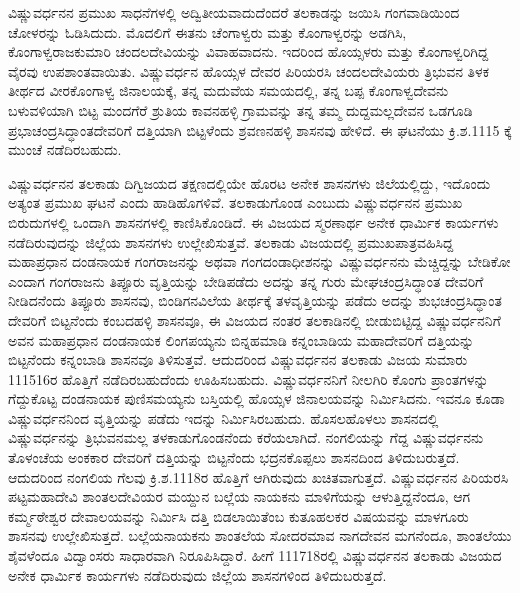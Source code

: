 ವಿಷ್ಣುವರ್ಧನನ ಪ್ರಮುಖ ಸಾಧನೆಗಳಲ್ಲಿ ಅದ್ವಿತೀಯವಾದುದೆಂದರೆ ತಲಕಾಡನ್ನು ಜಯಿಸಿ ಗಂಗವಾಡಿಯಿಂದ ಚೋಳರನ್ನು ಓಡಿಸಿದುದು. ಮೊದಲಿಗೆ ಈತನು ಚೆಂಗಾಳ್ವರು ಮತ್ತು ಕೊಂಗಾಳ್ವರನ್ನು ಅಡಗಿಸಿ, ಕೊಂಗಾಳ್ವರಾಜಕುಮಾರಿ ಚಂದಲದೇವಿಯನ್ನು ವಿವಾಹವಾದನು. ಇದರಿಂದ ಹೊಯ್ಸಳರು ಮತ್ತು ಕೊಂಗಾಳ್ವರಿಗಿದ್ದ ವೈರವು ಉಪಶಾಂತವಾಯಿತು. ವಿಷ್ಣುವರ್ಧನ ಹೊಯ್ಸಳ ದೇವರ ಪಿರಿಯರಸಿ ಚಂದಲದೇವಿಯರು ತ್ರಿಭುವನ ತಿಳಕ ತೀರ್ಥದ ವೀರಕೊಂಗಾಳ್ವ ಜಿನಾಲಯಕ್ಕೆ, ತನ್ನ ಮದುವೆಯ ಸಮಯದಲ್ಲಿ, ತನ್ನ ಬಪ್ಪ ಕೊಂಗಾಳ್ವದೇವನು ಬಳುವಳಿಯಾಗಿ ಬಿಟ್ಟ ಮಂದಗೆರೆ ಶ್ರುತಿಯ ಕಾವನಹಳ್ಳಿ ಗ್ರಾಮವನ್ನು ತನ್ನ ತಮ್ಮ ದುದ್ದಮಲ್ಲದೇವನ ಒಡಗೂಡಿ ಪ್ರಭಾಚಂದ್ರಸಿದ್ಧಾಂತದೇವರಿಗೆ ದತ್ತಿಯಾಗಿ ಬಿಟ್ಟಳೆಂದು ಶ್ರವಣನಹಳ್ಳಿ ಶಾಸನವು ಹೇಳಿದೆ. ಈ ಘಟನೆಯು ಕ್ರಿ.ಶ.1115 ಕ್ಕೆ ಮುಂಚೆ ನಡೆದಿರಬಹುದು. 

ವಿಷ್ಣುವರ್ಧನನ ತಲಕಾಡು ದಿಗ್ವಿಜಯದ ತಕ್ಷಣದಲ್ಲಿಯೇ ಹೊರಟ ಅನೇಕ ಶಾಸನಗಳು ಜಿಲೆಯಲ್ಲಿದ್ದು, ಇದೊಂದು ಅತ್ಯಂತ ಪ್ರಮುಖ ಘಟನೆ ಎಂದು ಹಾಡಿಹೊಗಳಿವೆ. ತಲಕಾಡುಗೊಂಡ ಎಂಬುದು ವಿಷ್ಣುವರ್ಧನನ ಪ್ರಮುಖ ಬಿರುದುಗಳಲ್ಲಿ ಒಂದಾಗಿ ಶಾಸನಗಳಲ್ಲಿ ಕಾಣಿಸಿಕೊಂಡಿದೆ. ಈ ವಿಜಯದ ಸ್ಮರಣಾರ್ಥ ಅನೇಕ ಧಾರ್ಮಿಕ ಕಾರ್ಯಗಳು ನಡೆದಿರುವುದನ್ನು ಜಿಲ್ಲೆಯ ಶಾಸನಗಳು ಉಲ್ಲೇಖಿಸುತ್ತವೆ. ತಲಕಾಡು ವಿಜಯದಲ್ಲಿ ಪ್ರಮುಖಪಾತ್ರವಹಿಸಿದ್ದ ಮಹಾಪ್ರಧಾನ ದಂಡನಾಯಕ ಗಂಗರಾಜನನ್ನು ಅಥವಾ ಗಂಗದಂಡಾಧೀಶನನ್ನು ವಿಷ್ಣುವರ್ಧನನು ಮೆಚ್ಚಿದ್ದನ್ನು ಬೇಡಿಕೋ ಎಂದಾಗ ಗಂಗರಾಜನು ತಿಪ್ಪೂರು ವೃತ್ತಿಯನ್ನು ಬೇಡಿಪಡೆದು ಅದನ್ನು ತನ್ನ ಗುರು ಮೇಘಚಂದ್ರಸಿದ್ಧಾಂತ ದೇವರಿಗೆ ನೀಡಿದನೆಂದು ತಿಪ್ಪೂರು ಶಾಸನವು, ಬಿಂಡಿಗನವಿಲೆಯ ತೀರ್ಥಕ್ಕೆ ತಳವೃತ್ತಿಯನ್ನು ಪಡೆದು ಅದನ್ನು ಶುಭಚಂದ್ರಸಿದ್ಧಾಂತ ದೇವರಿಗೆ ಬಿಟ್ಟನೆಂದು ಕಂಬದಹಳ್ಳಿ ಶಾಸನವೂ, ಈ ವಿಜಯದ ನಂತರ ತಲಕಾಡಿನಲ್ಲಿ ಬೀಡುಬಿಟ್ಟಿದ್ದ ವಿಷ್ಣುವರ್ಧನನಿಗೆ ಅವನ ಮಹಾಪ್ರಧಾನ ದಂಡನಾಯಕ ಲಿಂಗಪಯ್ಯನು ಬಿನ್ನಹಮಾಡಿ ಕನ್ನಂಬಾಡಿಯ ಮಹಾದೇವರಿಗೆ ದತ್ತಿಯನ್ನು ಬಿಟ್ಟನೆಂದು ಕನ್ನಂಬಾಡಿ ಶಾಸನವೂ ತಿಳಿಸುತ್ತವೆ. ಆದುದರಿಂದ ವಿಷ್ಣುವರ್ಧನನ ತಲಕಾಡು ವಿಜಯ ಸುಮಾರು 111516ರ ಹೊತ್ತಿಗೆ ನಡೆದಿರಬಹುದೆಂದು ಊಹಿಸಬಹುದು. ವಿಷ್ಣುವರ್ಧನನಿಗೆ ನೀಲಗಿರಿ ಕೊಂಗು ಪ್ರಾಂತಗಳನ್ನು ಗೆದ್ದುಕೊಟ್ಟ ದಂಡನಾಯಕ ಪುಣಿಸಮಯ್ಯನು ಬಸ್ತಿಯಲ್ಲಿ ಹೊಯ್ಸಳ ಜಿನಾಲಯವನ್ನು ನಿರ್ಮಿಸಿದನು. ಇವನೂ ಕೂಡಾ ವಿಷ್ಣುವರ್ಧನನಿಂದ ವೃತ್ತಿಯನ್ನು ಪಡೆದು ಇದನ್ನು ನಿರ್ಮಿಸಿರಬಹುದು. ಹೊಸಲಹೊಳಲು ಶಾಸನದಲ್ಲಿ ವಿಷ್ಣುವರ್ಧನನ್ನು ತ್ರಿಭುವನಮಲ್ಲ ತಳಕಾಡುಗೊಂಡನೆಂದು ಕರೆಯಲಾಗಿದೆ. ನಂಗಲಿಯನ್ನು ಗೆದ್ದ ವಿಷ್ಣುವರ್ಧನನು ತೊಳಂಚೆಯ ಅಂಕಕಾರ ದೇವರಿಗೆ ದತ್ತಿಯನ್ನು ಬಿಟ್ಟನೆಂದು ಭದ್ರನಕೊಪ್ಪಲು ಶಾಸನದಿಂದ ತಿಳಿದು\-ಬರುತ್ತದೆ. ಆದುದರಿಂದ ನಂಗಲಿಯ ಗೆಲವು ಕ್ರಿ.ಶ.1118ರ ಹೊತ್ತಿಗೆ ಆಗಿರುವುದು ಖಚಿತವಾಗುತ್ತದೆ. ವಿಷ್ಣುವರ್ಧನನ ಪಿರಿಯರಸಿ ಪಟ್ಟಮಹಾದೇವಿ ಶಾಂತಲದೇವಿಯರ ಮಯ್ದುನ ಬಲ್ಲೆಯ ನಾಯಕನು ಮಾಳಿಗೆಯನ್ನು ಆಳುತ್ತಿದ್ದನೆಂದೂ, ಆಗ ಕರ್ಮ್ಮಠೇಶ್ವರ ದೇವಾಲಯವನ್ನು ನಿರ್ಮಿಸಿ ದತ್ತಿ ಬಿಡಲಾಯಿತೆಂಬ ಕುತೂಹಲಕರ ವಿಷಯವನ್ನು ಮಾಳಗೂರು ಶಾಸನವು ಉಲ್ಲೇಖಿಸುತ್ತದೆ. ಬಲ್ಲೆಯನಾಯಕನು ಶಾಂತಲೆಯ ಸೋದರಮಾವ ನಾಗದೇವನ ಮಗನೆಂದೂ, ಶಾಂತಲೆಯು ಶೈವಳೆಂದೂ ವಿದ್ವಾಂಸರು ಸಾಧಾರವಾಗಿ ನಿರೂಪಿಸಿದ್ದಾರೆ. ಹೀಗೆ 111718ರಲ್ಲಿ ವಿಷ್ಣುವರ್ಧನನ ತಲಕಾಡು ವಿಜಯದ ಅನೇಕ ಧಾರ್ಮಿಕ ಕಾರ್ಯಗಳು ನಡೆದಿರುವುದು ಜಿಲ್ಲೆಯ ಶಾಸನಗಳಿಂದ ತಿಳಿದುಬರುತ್ತದೆ.

